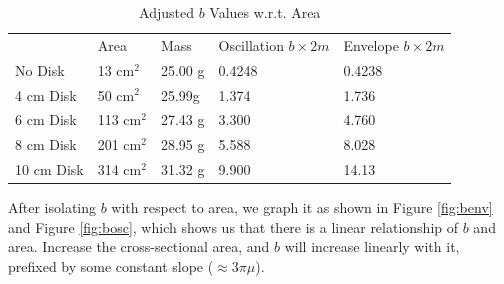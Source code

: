 \documentclass[12pt,letterpaper]{article}
\begin{document}
\begin{table}[ht]
\centering
\begin{tabular}{lllll}
                                & Area                            & Mass                         & Oscillation $b\times 2m$ & Envelope $b\times 2m$ \\ \cline{2-5} 
\multicolumn{1}{l|}{No Disk}    & \multicolumn{1}{l|}{13 cm$^2$}  & \multicolumn{1}{l|}{25.00 g} & \multicolumn{1}{l|}{0.4248}             & \multicolumn{1}{l|}{0.4238}          \\ \cline{2-5} 
\multicolumn{1}{l|}{4 cm Disk}  & \multicolumn{1}{l|}{50 cm$^2$}  & \multicolumn{1}{l|}{25.99g}  & \multicolumn{1}{l|}{1.374}              & \multicolumn{1}{l|}{1.736}           \\ \cline{2-5} 
\multicolumn{1}{l|}{6 cm Disk}  & \multicolumn{1}{l|}{113 cm$^2$} & \multicolumn{1}{l|}{27.43 g} & \multicolumn{1}{l|}{3.300}              & \multicolumn{1}{l|}{4.760}           \\ \cline{2-5} 
\multicolumn{1}{l|}{8 cm Disk}  & \multicolumn{1}{l|}{201 cm$^2$} & \multicolumn{1}{l|}{28.95 g} & \multicolumn{1}{l|}{5.588}              & \multicolumn{1}{l|}{8.028}           \\ \cline{2-5} 
\multicolumn{1}{l|}{10 cm Disk} & \multicolumn{1}{l|}{314 cm$^2$} & \multicolumn{1}{l|}{31.32 g} & \multicolumn{1}{l|}{9.900}              & \multicolumn{1}{l|}{14.13}           \\ \cline{2-5} 
\end{tabular}
\caption{Adjusted $b$ Values w.r.t. Area}
\label{tab:barea}
\end{table}

After isolating $b$ with respect to area, we graph it as shown in Figure \ref{fig:benv} and Figure \ref{fig:bosc}, which shows us that there is a linear relationship of $b$ and area. Increase the cross-sectional area, and $b$ will increase linearly with it, prefixed by some constant slope ($\approx3\pi\mu$).
\end{document}
